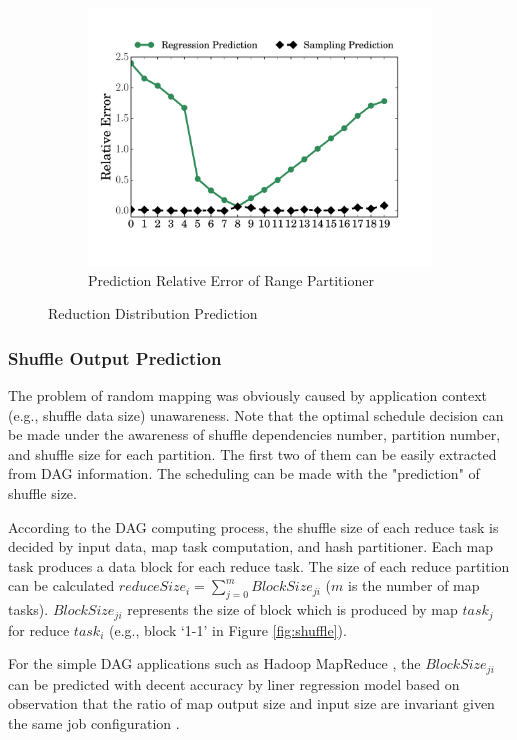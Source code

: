 \begin{figure}
\begin{subfigure}[b]{0.32\linewidth}
		\includegraphics[width=\linewidth]{fig/prediction_relative_error}
		\caption{Prediction Relative Error of Range Partitioner}
		\label{fig:prediction_relative_error}
	\end{subfigure}
	\caption{Reduction Distribution Prediction}
	\label{fig:dis}
\end{figure}

\subsubsection{Shuffle Output Prediction}\label{shuffleprediction}
The problem of random mapping was obviously caused by application context (e.g., shuffle data size) unawareness. Note that the optimal schedule decision can be made under the awareness of shuffle dependencies number, partition number, and shuffle size for each partition. The first two of them can be easily extracted from DAG information. The scheduling can be made with the "prediction" of shuffle size.

According to the DAG computing process, the shuffle size of each reduce task is decided by input data, map task computation, and hash partitioner. Each map task produces a data block for each reduce task. The size of each reduce partition can be calculated $reduceSize_i = \sum_{j=0}^{m} {BlockSize_{ji}}$ ($m$ is the number of map tasks). $BlockSize_{ji}$ represents the size of block which is produced by map $task_j$ for reduce $task_i$ (e.g., block `1-1' in Figure \ref{fig:shuffle}).

For the simple DAG applications such as Hadoop MapReduce \cite{mapreduce}, the $BlockSize_{ji}$ can be predicted with decent accuracy by liner regression model based on observation that the ratio of map output size and input size are invariant given the same job configuration \cite{ishuffle, predict}.

